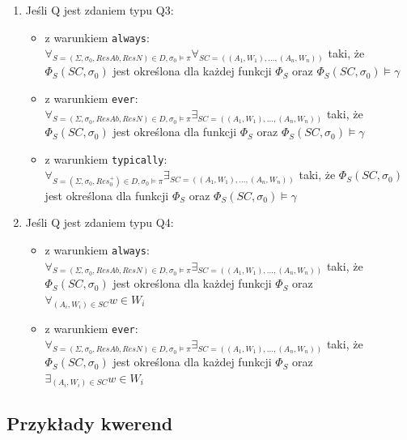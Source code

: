 \documentclass{article}
\begin{document}
\begin{enumerate}
	\item Jeśli Q jest zdaniem typu Q3:
	\begin{itemize}
		\item z warunkiem \texttt{always}: 
		$\forall_{S=(\Sigma, \sigma_{0}, ResAb, ResN) \in D, \sigma_{0} \models \pi} \forall_{SC=((A_{1}, W_{1}), \dots, (A_{n}, W_{n}))}$ taki, że $\Phi_{S}(SC, \sigma_{0})$ jest określona dla każdej funkcji $\Phi_{S}$ oraz $\Phi_{S}(SC, \sigma_{0}) \models \gamma$
		\item z warunkiem \texttt{ever}:
		$\forall_{S=(\Sigma, \sigma_{0}, ResAb, ResN) \in D, \sigma_{0} \models \pi} \exists_{SC=((A_{1}, W_{1}), \dots, (A_{n}, W_{n}))}$ taki, że $\Phi_{S}(SC, \sigma_{0})$ jest określona dla funkcji $\Phi_{S}$ oraz $\Phi_{S}(SC, \sigma_{0}) \models \gamma$
		\item z warunkiem \texttt{typically}:
		$\forall_{S=(\Sigma, \sigma_{0}, Res_{0}^{+}) \in D, \sigma_{0} \models \pi} \exists_{SC=((A_{1}, W_{1}), \dots, (A_{n}, W_{n}))}$ taki, że $\Phi_{S}(SC, \sigma_{0})$ jest określona dla funkcji $\Phi_{S}$ oraz $\Phi_{S}(SC, \sigma_{0}) \models \gamma$
	\end{itemize}
	\item Jeśli Q jest zdaniem typu Q4:
	\begin{itemize}
		\item z warunkiem \texttt{always}: 
		$\forall_{S=(\Sigma, \sigma_{0}, ResAb, ResN) \in D, \sigma_{0} \models \pi} \exists_{SC=((A_{1}, W_{1}), \dots, (A_{n}, W_{n}))}$ taki, że $\Phi_{S}(SC, \sigma_{0})$ jest określona dla każdej funkcji $\Phi_{S}$ oraz $\forall_{(A_{i}, W_{i}) \in SC} w \in W_{i}$
		\item z warunkiem \texttt{ever}:
		$\forall_{S=(\Sigma, \sigma_{0}, ResAb, ResN) \in D, \sigma_{0} \models \pi} \exists_{SC=((A_{1}, W_{1}), \dots, (A_{n}, W_{n}))}$ taki, że $\Phi_{S}(SC, \sigma_{0})$ jest określona dla każdej funkcji $\Phi_{S}$ oraz $\exists_{(A_{i}, W_{i}) \in SC} w \in W_{i}$
	\end{itemize}
\end{enumerate} 


\newpage
\subsection{Przykłady kwerend}
\end{document}
